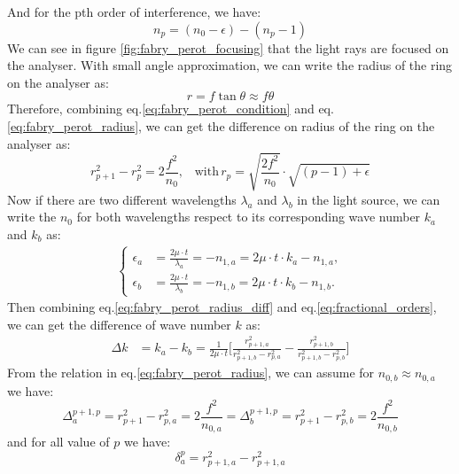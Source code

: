 \documentclass[a4paper,12pt]{article}
\begin{document}
\indent And for the pth order of interference, we have:
\begin{equation}
    n_p = (n_0 - \epsilon) - (n_p -1)
\end{equation}
\indent We can see in figure \ref{fig:fabry_perot_focusing} that the light rays are focused on the analyser. With small angle approximation, we can write the radius of the ring on the analyser as:
\begin{equation}
    r = f \tan\theta \approx f \theta
    \label{eq:fabry_perot_radius}
\end{equation}
\indent Therefore, combining eq.\ref{eq:fabry_perot_condition} and eq.\ref{eq:fabry_perot_radius}, we can get the difference on radius of the ring on the analyser as:
\begin{equation}
     r^2_{p+1} - r^2_{p} = 2 \frac{f^2}{n_0}, ~~~\,\text{with}\, r_p = \sqrt{\frac{2f^2}{n_0}} \cdot \sqrt{(p-1) + \epsilon} 
    \label{eq:fabry_perot_radius_diff}
\end{equation}
\indent Now if there are two different wavelengths $\lambda_a$ and $\lambda_b$ in the light source, we can write the $n_0$ for both wavelengths respect to its corresponding wave number $k_a$ and $k_b$ as:
\begin{align}
    \begin{cases}
        \epsilon_a &= \frac{2\mu \cdot t}{\lambda_a} = -n_{1,a} = 2\mu \cdot t \cdot k_a - n_{1,a}, \\
        \epsilon_b &= \frac{2\mu \cdot t}{\lambda_b} = -n_{1,b} = 2\mu \cdot t \cdot k_b - n_{1,b}.
    \end{cases}
    \label{eq:fractional_orders}
\end{align}
\indent Then combining eq.\ref{eq:fabry_perot_radius_diff} and eq.\ref{eq:fractional_orders}, we can get the difference of wave number $k$ as:
\begin{align}
    \Delta k &= k_a - k_b = \frac{1}{2\mu \cdot t} \biggl[ \frac{r_{p+1,a}^2}{r_{p+1,b}^2 - r_{p,a}^2} - \frac{r_{p+1,b}^2}{r_{p+1,b}^2 - r_{p,b}^2} \biggr]
    \label{eq:wave_number_diff}
\end{align}
\indent From the relation in eq.\ref{eq:fabry_perot_radius}, we can assume for $n_{0,b} \approx n_{0,a}$ we have:
\begin{equation}
    \Delta^{p+1,p}_{a} = r^2_{p+1} - r^2_{p,a} = 2 \frac{f^2}{n_{0,a}} = \Delta^{p+1,p}_{b} = r^2_{p+1} - r^2_{p,b} = 2 \frac{f^2}{n_{0,b}}
\end{equation}
\indent and for all value of $p$ we have: 
\begin{equation}
    \delta^{p}_{a} = r^2_{p+1,a} - r^2_{p+1,a} 
\end{equation}
\end{document}
